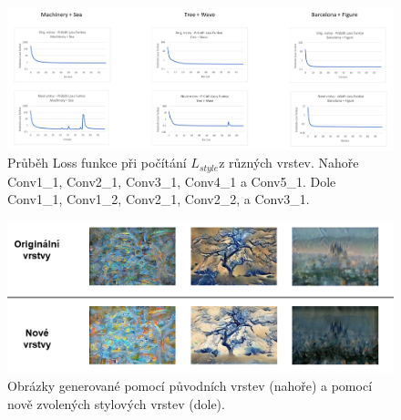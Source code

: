 \documentclass[twocolumn]{article}
\begin{document}
	
	\begin{figure}[t]
		\includegraphics[width=18cm]{Ex2G_lez.png}
		\caption{Průběh Loss funkce při počítání $L_{style}$z různých vrstev. Nahoře Conv1\_1, Conv2\_1, Conv3\_1, Conv4\_1 a Conv5\_1. Dole Conv1\_1, Conv1\_2, Conv2\_1, Conv2\_2, a Conv3\_1.}
		\label{Exp2_G}
	\end{figure}

	
\begin{figure}[h]
	\includegraphics[width=\linewidth]{Ex2O_lez.png}
	\centering
	\caption{Obrázky generované pomocí původních vrstev (nahoře) a pomocí nově zvolených stylových vrstev (dole).}
	\label{Exp2_O}
\end{figure}
\end{document}
